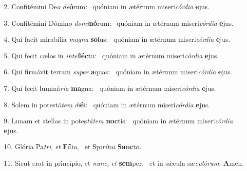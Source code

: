 2. Confitémini De\textit{o} \textit{de}\textbf{ó}rum: \ast\  quóniam in ætérnum miseri\textit{cór}\textit{di}\textit{a} \textbf{e}jus.\

3. Confitémini Dómino \textit{do}\textit{mi}\textbf{nó}rum: \ast\  quóniam in ætérnum miseri\textit{cór}\textit{di}\textit{a} \textbf{e}jus.\

4. Qui facit mirabília \textit{ma}\textit{gna} \textbf{so}lus: \ast\  quóniam in ætérnum miseri\textit{cór}\textit{di}\textit{a} \textbf{e}jus.\

5. Qui fecit cælos in \textit{in}\textit{tel}\textbf{léc}tu: \ast\  quóniam in ætérnum miseri\textit{cór}\textit{di}\textit{a} \textbf{e}jus.\

6. Qui firmávit terram \textit{su}\textit{per} \textbf{a}quas: \ast\  quóniam in ætérnum miseri\textit{cór}\textit{di}\textit{a} \textbf{e}jus.\

7. Qui fecit luminá\textit{ri}\textit{a} \textbf{ma}gna: \ast\  quóniam in ætérnum miseri\textit{cór}\textit{di}\textit{a} \textbf{e}jus.\

8. Solem in potestá\textit{tem} \textit{di}\textbf{é}i: \ast\  quóniam in ætérnum miseri\textit{cór}\textit{di}\textit{a} \textbf{e}jus.\

9. Lunam et stellas in potes\textit{tá}\textit{tem} \textbf{noc}tis: \ast\  quóniam in ætérnum miseri\textit{cór}\textit{di}\textit{a} \textbf{e}jus.\

10. Glória Pa\textit{tri}, \textit{et} \textbf{Fí}lio, \ast\  et Spi\textit{rí}\textit{tu}\textit{i} \textbf{Sanc}to.\

11. Sicut erat in princípio, et \textit{nunc}, \textit{et} \textbf{sem}per, \ast\  et in sǽcula sæ\textit{cu}\textit{ló}\textit{rum}. \textbf{A}men.\

